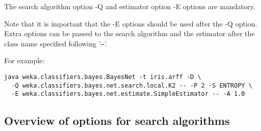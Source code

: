 \documentclass[a4paper]{article}
\begin{document}
The search algorithm option -Q and estimator option -E options are mandatory.

Note that it is important that the -E options should be used after the
-Q option. Extra options can be passed to the search algorithm and
the estimator after the class name specified following '\texttt{--}'.

\noindent For example:
{\small
\begin{verbatim}
java weka.classifiers.bayes.BayesNet -t iris.arff -D \
  -Q weka.classifiers.bayes.net.search.local.K2 -- -P 2 -S ENTROPY \
  -E weka.classifiers.bayes.net.estimate.SimpleEstimator -- -A 1.0
\end{verbatim}
}

\subsection*{Overview of options for search algorithms}
\end{document}
